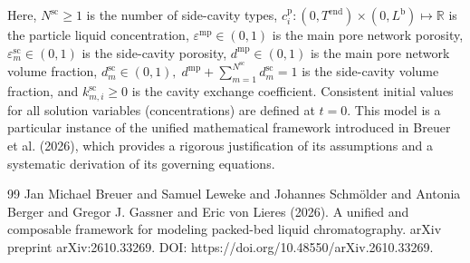 \documentclass{article}
\begin{document}
Here, $N^{\mathrm{sc}}\geq 1$ is the number of side-cavity types, $c^{\mathrm{p}}_{i}\colon (0, T^{\mathrm{end}}) \times (0, L^{\mathrm{b}}) \mapsto \mathbb{R}$ is the particle liquid concentration, $\varepsilon^{\mathrm{mp}}\in (0, 1)$ is the main pore network porosity, $\varepsilon^{\mathrm{sc}}_{m}\in (0, 1)$ is the side-cavity porosity, $d^{\mathrm{mp}}\in (0, 1)$ is the main pore network volume fraction, $d^{\mathrm{sc}}_{m}\in (0, 1), \; d^{\mathrm{mp}} + \sum_{m=1}^{N^{\mathrm{sc}}} d^{\mathrm{sc}}_{m} = 1$ is the side-cavity volume fraction, and $k^{\mathrm{sc}}_{m,i}\geq 0$ is the cavity exchange coefficient.
Consistent initial values for all solution variables (concentrations) are defined at $t = 0$.
This model is a particular instance of the unified mathematical framework introduced in Breuer et al. (2026), which provides a rigorous justification of its assumptions and a systematic derivation of its governing equations.
\begin{thebibliography}{99}
     Jan Michael Breuer and Samuel Leweke and Johannes Schmölder and Antonia Berger and Gregor J. Gassner and Eric von Lieres (2026). A unified and composable framework for modeling packed-bed liquid chromatography. arXiv preprint arXiv:2610.33269. DOI: https://doi.org/10.48550/arXiv.2610.33269.
\end{thebibliography}
\end{document}
